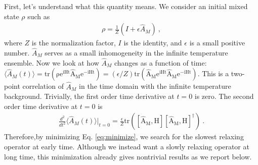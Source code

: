 \documentclass[twocolumn,superscriptaddress, prb]{revtex4-1}
\begin{document}
First, let's understand what this quantity means.
We consider an initial mixed state $\rho$ such as
\begin{align}\label{eq:initial}
\rho = \frac{1}{Z}\left(I + \epsilon \hat{A}_M\right) ~,
\end{align}
where $Z$ is the normalization factor, $I$ is the identity, and $\epsilon$ is a small positive number.
$\hat{A}_M$ serves as a small inhomogeneity in the infinite temperature ensemble.
Now we look at how $\hat{A}_M$ changes as a function of time:
$\langle \hat{A}_M(t) \rangle = \mathrm{tr(\rho e^{iHt} \hat{A}_M e^{-iHt})} = (\epsilon/Z)\mathrm{tr(\hat{A}_M e^{iHt} \hat{A}_M e^{-iHt})}$.
This is a two-point correlation of $\hat{A}_M$ in the time domain with the infinite temperature background.
Trivially, the first order time derivative at $t = 0$ is zero. The second order time derivative at $t = 0$ is
\begin{align}
\frac{d^2}{dt^2}\langle \hat{A}_M(t)\rangle\bigg|_{t=0} = \frac{\epsilon}{Z}\mathrm{tr([\hat{A}_M,H][\hat{A}_M,H]^\dag)} ~.
\end{align}
Therefore,by minimizing Eq. \eqref{eq:minimize},
we search for the slowest relaxing operator at early time.
Although we instead want a slowly relaxing operator at long time,
this minimization already gives nontrivial results as we report below.
\end{document}
